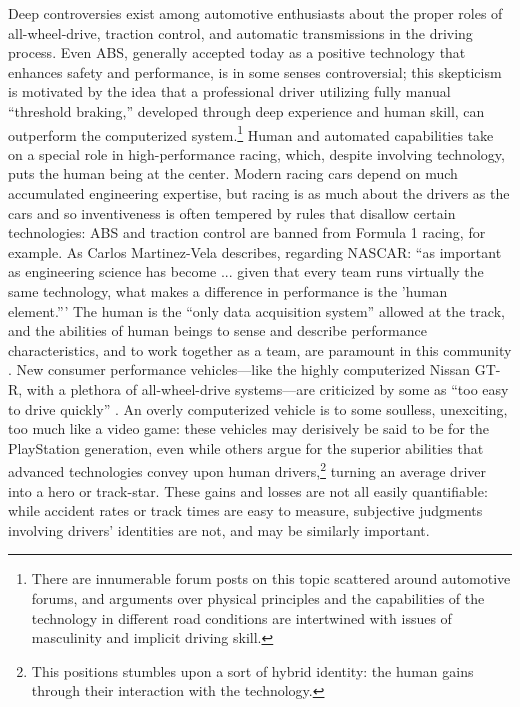 Deep controversies exist among automotive
enthusiasts about the proper roles of all-wheel-drive, traction
control, and automatic transmissions in the driving process. Even ABS,
generally accepted today as a positive technology that enhances safety and
performance, is in some senses controversial; this skepticism is
motivated by the idea that 
a professional driver utilizing fully manual ``threshold braking,''
developed through deep experience and human skill, can outperform the
computerized system.\footnote{There are innumerable forum posts on
  this topic scattered around automotive forums, and arguments over
  physical principles and the capabilities of the technology in
  different road conditions are
  intertwined with issues of masculinity and implicit driving skill.}
Human and automated capabilities take on a special role in
  high-performance racing, which, despite involving technology, puts the
  human being at the center. Modern racing cars depend on
much accumulated engineering expertise, but racing is as much about
the drivers as the cars and so inventiveness is often tempered by
rules that disallow certain technologies:  ABS and traction control are
banned from Formula 1 racing, for example. As Carlos Martinez-Vela
describes, regarding NASCAR: ``as important as engineering science has
become ... given
that every team runs virtually the same technology, what makes a
difference in performance is the 'human element.''' The human is the ``only data acquisition
system'' allowed at the track, and the abilities of human beings to
sense and describe performance characteristics, and to work together
as a team, are paramount in this community \cite[p.
  178]{martinezvela}. New consumer performance vehicles---like the 
highly computerized Nissan GT-R, with a plethora of all-wheel-drive
systems---are criticized by some as ``too easy to drive quickly'' \cite{edmunds}.
An overly computerized vehicle is to some soulless, unexciting, too much like
a video game: these vehicles may derisively be said to be for the
PlayStation generation, even while others argue for the superior
abilities that advanced technologies convey upon human
drivers,\footnote{This positions stumbles upon a sort of hybrid
  identity: the  human gains through their 
interaction with the technology.}
turning an average driver into a hero or track-star. These gains and
losses are not all easily quantifiable: while accident rates or track
times are easy to measure, subjective judgments involving drivers'
identities are not, and may be similarly important.

